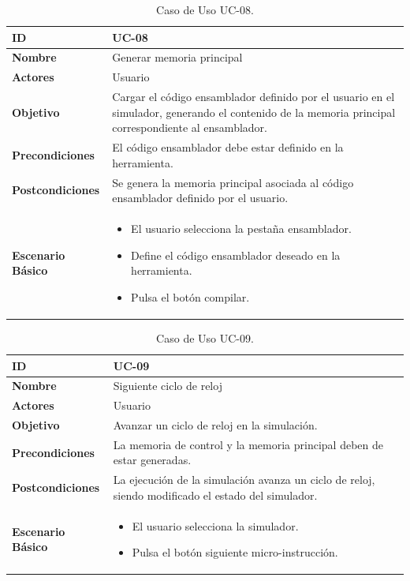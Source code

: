 \begin{center}
\begin{table}[htbp]
\centering
\begin{tabular}{@{}p{2.5cm} p{9cm}@{}} 
\toprule
\textbf{ID}	& UC-08  \\
\midrule
\textbf{Nombre} 		& Generar memoria principal   \\
\midrule
\textbf{Actores} 		&	Usuario  \\
\midrule
\textbf{Objetivo} 	&	Cargar el código ensamblador definido por el usuario en el simulador, generando el contenido de la memoria principal correspondiente al ensamblador. 	 \\
\midrule
\textbf{Precondiciones}	&	El código ensamblador debe estar definido en la herramienta.  \\
\midrule
\textbf{Postcondiciones} 	& Se genera la memoria principal asociada al código ensamblador definido por el usuario.   \\
\midrule
\textbf{Escenario Básico} 	&  \begin{itemize}
\item El usuario selecciona la pestaña ensamblador.
\item Define el código ensamblador deseado en la herramienta.
\item Pulsa el botón compilar.
\end{itemize} \\
\bottomrule
\end{tabular}
\caption{Caso de Uso UC-08.}
\label{tab:uc08}
\end{table}
\end{center}

\begin{center}
\begin{table}[htbp]
\centering
\begin{tabular}{@{}p{2.5cm} p{9cm}@{}} 
\toprule
\textbf{ID}	& UC-09  \\
\midrule
\textbf{Nombre} 		& Siguiente ciclo de reloj   \\
\midrule
\textbf{Actores} 		&	Usuario  \\
\midrule
\textbf{Objetivo} 	&	Avanzar un ciclo de reloj en la simulación.	 \\
\midrule
\textbf{Precondiciones}	&	La memoria de control y la memoria principal deben de estar generadas.  \\
\midrule
\textbf{Postcondiciones} 	& La ejecución de la simulación avanza un ciclo de reloj, siendo modificado el estado del simulador.   \\
\midrule
\textbf{Escenario Básico} 	&  \begin{itemize}
\item El usuario selecciona la simulador.
\item Pulsa el botón siguiente micro-instrucción.
\end{itemize} \\
\bottomrule
\end{tabular}
\caption{Caso de Uso UC-09.}
\label{tab:uc09}
\end{table}
\end{center}

